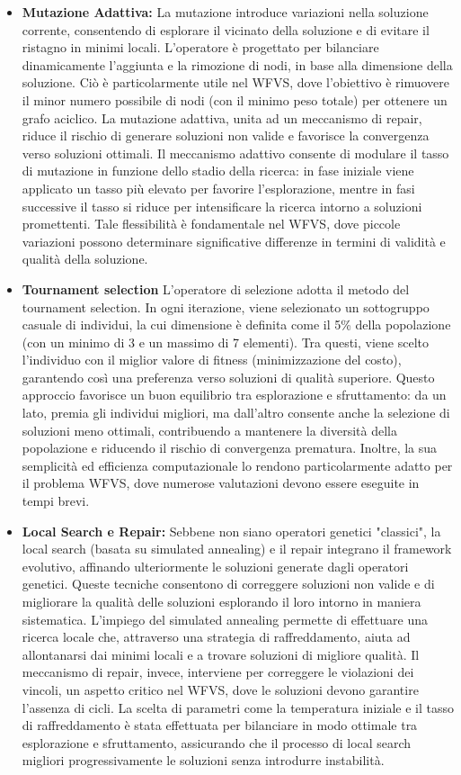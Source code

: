 \documentclass[12pt,a4paper,twoside]{article}
\begin{document}
\begin{itemize}
\item \textbf{Mutazione Adattiva:} La mutazione introduce variazioni nella soluzione corrente, consentendo di esplorare il vicinato della soluzione e di evitare il ristagno in minimi locali. L'operatore è progettato per bilanciare dinamicamente l'aggiunta e la rimozione di nodi, in base alla dimensione della soluzione. Ciò è particolarmente utile nel WFVS, dove l'obiettivo è rimuovere il minor numero possibile di nodi (con il minimo peso totale) per ottenere un grafo aciclico. La mutazione adattiva, unita ad un meccanismo di repair, riduce il rischio di generare soluzioni non valide e favorisce la convergenza verso soluzioni ottimali.  
Il meccanismo adattivo consente di modulare il tasso di mutazione in funzione dello stadio della ricerca: in fase iniziale viene applicato un tasso più elevato per favorire l’esplorazione, mentre in fasi successive il tasso si riduce per intensificare la ricerca intorno a soluzioni promettenti. Tale flessibilità è fondamentale nel WFVS, dove piccole variazioni possono determinare significative differenze in termini di validità e qualità della soluzione.
\item \textbf{Tournament selection} L'operatore di selezione  adotta il metodo del tournament selection. In ogni iterazione, viene selezionato un sottogruppo casuale di individui, la cui dimensione è definita come il 5\% della popolazione (con un minimo di 3 e un massimo di 7 elementi). Tra questi, viene scelto l'individuo con il miglior valore di fitness (minimizzazione del costo), garantendo così una preferenza verso soluzioni di qualità superiore. Questo approccio favorisce un buon equilibrio tra esplorazione e sfruttamento: da un lato, premia gli individui migliori, ma dall'altro consente anche la selezione di soluzioni meno ottimali, contribuendo a mantenere la diversità della popolazione e riducendo il rischio di convergenza prematura. Inoltre, la sua semplicità ed efficienza computazionale lo rendono particolarmente adatto per il problema WFVS, dove numerose valutazioni devono essere eseguite in tempi brevi.

\item \textbf{Local Search e Repair:} Sebbene non siano operatori genetici "classici", la local search (basata su simulated annealing) e il repair integrano il framework evolutivo, affinando ulteriormente le soluzioni generate dagli operatori genetici. Queste tecniche consentono di correggere soluzioni non valide e di migliorare la qualità delle soluzioni esplorando il loro intorno in maniera sistematica.  
L'impiego del simulated annealing permette di effettuare una ricerca locale che, attraverso una strategia di raffreddamento, aiuta ad allontanarsi dai minimi locali e a trovare soluzioni di migliore qualità. Il meccanismo di repair, invece, interviene per correggere le violazioni dei vincoli, un aspetto critico nel WFVS, dove le soluzioni devono garantire l'assenza di cicli. La scelta di parametri come la temperatura iniziale e il tasso di raffreddamento è stata effettuata per bilanciare in modo ottimale tra esplorazione e sfruttamento, assicurando che il processo di local search migliori progressivamente le soluzioni senza introdurre instabilità.


\end{itemize}
\end{document}
